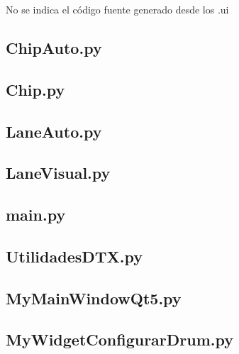 \documentclass[a4paper,11pt,oneside]{book}
\begin{document}
No se indica el código fuente generado desde los .ui

\subsection{ChipAuto.py}



\subsection{Chip.py}



\subsection{LaneAuto.py}



\subsection{LaneVisual.py}



\subsection{main.py}



\subsection{UtilidadesDTX.py}



\subsection{MyMainWindowQt5.py}



\subsection{MyWidgetConfigurarDrum.py}
\end{document}
